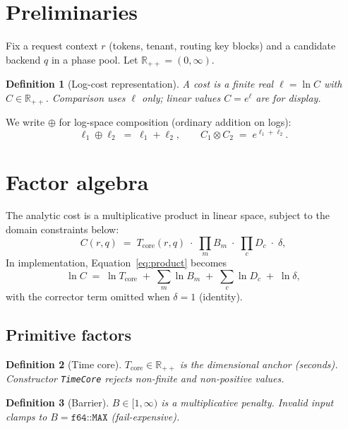 \documentclass[11pt,a4paper]{article}
\newtheorem{definition}{Definition}
\begin{document}
\section{Preliminaries}

Fix a request context $r$ (tokens, tenant, routing key blocks) and a
candidate backend $q$ in a phase pool.
Let $\mathbb{R}_{++} = (0,\infty)$.

\begin{definition}[Log-cost representation]
A \emph{cost} is a finite real $\ell = \ln C$ with $C \in \mathbb{R}_{++}$.
Comparison uses $\ell$ only; linear values $C = e^{\ell}$ are for display.
\end{definition}

We write $\oplus$ for log-space composition (ordinary addition on logs):
\[
  \ell_1 \oplus \ell_2 \;=\; \ell_1 + \ell_2,
  \qquad
  C_1 \otimes C_2 \;=\; e^{\ell_1 + \ell_2}.
\]

\section{Factor algebra}

The analytic cost is a multiplicative product in linear space, subject to
the domain constraints below:
\begin{equation}\label{eq:product}
  C(r,q)
  \;=\;
  T_{\mathrm{core}}(r,q)
  \;\cdot\;
  \prod_{m} B_m
  \;\cdot\;
  \prod_{c} D_c
  \;\cdot\;
  \delta,
\end{equation}
In implementation, Equation~\eqref{eq:product} becomes
\begin{equation}\label{eq:logcompose}
  \ln C
  \;=\;
  \ln T_{\mathrm{core}}
  \;+\;
  \sum_m \ln B_m
  \;+\;
  \sum_c \ln D_c
  \;+\;
  \ln \delta,
\end{equation}
with the corrector term omitted when $\delta = 1$ (identity).

\subsection{Primitive factors}

\begin{definition}[Time core]
$T_{\mathrm{core}} \in \mathbb{R}_{++}$ is the dimensional anchor (seconds).
Constructor \texttt{TimeCore} rejects non-finite and non-positive values.
\end{definition}

\begin{definition}[Barrier]
$B \in [1, \infty)$ is a multiplicative \emph{penalty}.
Invalid input clamps to $B = \texttt{f64::MAX}$ (fail-expensive).
\end{definition}
\end{document}
